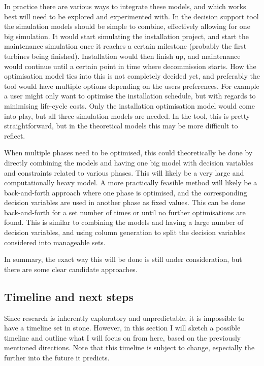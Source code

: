 \documentclass[a4paper,12pt]{article}
\begin{document}
In practice there are various ways to integrate these models, and which works best will need to be explored and experimented with. In the decision support tool the simulation models should be simple to combine, effectively allowing for one big simulation. It would start simulating the installation project, and start the maintenance simulation once it reaches a certain milestone (probably the first turbines being finished). Installation would then finish up, and maintenance would continue until a certain point in time where decommission starts. How the optimisation model ties into this is not completely decided yet, and preferably the tool would have multiple options depending on the users preferences. For example a user might only want to optimise the installation schedule, but with regards to minimising life-cycle costs. Only the installation optimisation model would come into play, but all three simulation models are needed. In the tool, this is pretty straightforward, but in the theoretical models this may be more difficult to reflect. 

When multiple phases need to be optimised, this could theoretically be done by directly combining the models and having one big model with decision variables and constraints related to various phases. This will likely be a very large and computationally heavy model. A more practically feasible method will likely be a back-and-forth approach where one phase is optimised, and the corresponding decision variables are used in another phase as fixed values. This can be done back-and-forth for a set number of times or until no further optimisations are found. This is similar to combining the models and having a large number of decision variables, and using column generation to split the decision variables considered into manageable sets. 

In summary, the exact way this will be done is still under consideration, but there are some clear candidate approaches. 

\fi

\subsection{Timeline and next steps} \label{ss:timel}
Since research is inherently exploratory and unpredictable, it is impossible to have a timeline set in stone. However, in this section I will sketch a possible timeline and outline what I will focus on from here, based on the previously mentioned directions. Note that this timeline is subject to change, especially the further into the future it predicts. 
\end{document}
